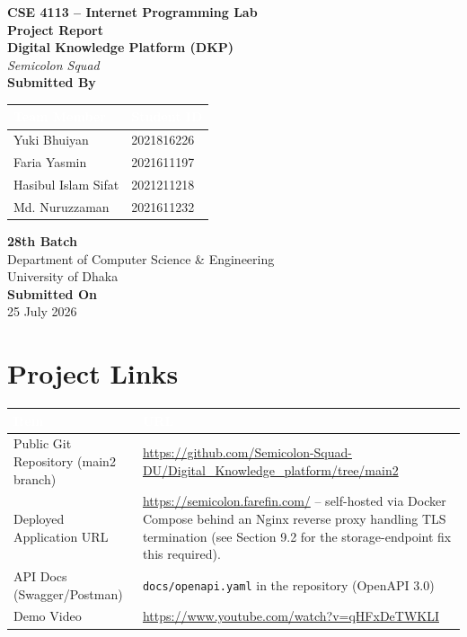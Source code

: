 \documentclass[12pt]{article}
\title{}
\date{}
\begin{document}
\begin{titlepage}
\centering
\vspace*{1.2cm}
{\bfseries\large CSE 4113 -- Internet Programming Lab}\\[1.8cm]
{\bfseries\Huge Project Report}\\[1.8cm]

{\bfseries\Large Digital Knowledge Platform (DKP)}\\[0.3cm]
{\itshape\color{gray} Semicolon Squad}\\[1.4cm]

{\bfseries Submitted By}\\[0.5cm]

\renewcommand{\arraystretch}{1.4}
\begin{tabular}{|L{7cm}|L{5cm}|}
\hline
{} \textcolor{white}{\bfseries Team Member} & \textcolor{white}{\bfseries Student ID} \\
\hline
Yuki Bhuiyan & 2021816226 \\
\hline
Faria Yasmin & 2021611197 \\
\hline
Hasibul Islam Sifat & 2021211218 \\
\hline
Md. Nuruzzaman & 2021611232 \\
\hline
\end{tabular}

\vspace{1.4cm}
{\bfseries 28th Batch}\\
Department of Computer Science \& Engineering\\
University of Dhaka\\[1cm]

{\bfseries Submitted On}\\
{25 July 2026}
\vfill

\end{titlepage}

\section*{Project Links}

\renewcommand{\arraystretch}{1.4}
\begin{longtable}{|L{5cm}|L{9.5cm}|}
\hline
{} \textcolor{white}{\bfseries Item} & \textcolor{white}{\bfseries URL} \\
\hline
Public Git Repository (main2 branch) & \url{https://github.com/Semicolon-Squad-DU/Digital_Knowledge_platform/tree/main2} \\
\hline
Deployed Application URL & \url{https://semicolon.farefin.com/} -- self-hosted via Docker Compose behind an Nginx reverse proxy handling TLS termination (see Section 9.2 for the storage-endpoint fix this required). \\
\hline
API Docs (Swagger/Postman) & \texttt{docs/openapi.yaml} in the repository (OpenAPI 3.0) \\
\hline
Demo Video & \url{https://www.youtube.com/watch?v=qHFxDeTWKLI} \\
\hline
\end{longtable}
\end{document}
